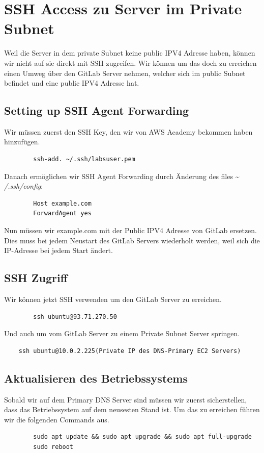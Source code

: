 \documentclass[a4paper,12pt]{article}
\begin{document}
\section{SSH Access zu Server im Private Subnet}
Weil die Server in dem private Subnet keine public IPV4 Adresse haben, können wir nicht auf sie direkt mit SSH zugreifen. 
Wir können um das doch zu erreichen einen Umweg über den GitLab Server nehmen, welcher sich im public Subnet befindet und eine public IPV4 Adresse hat.

\subsection{Setting up SSH Agent Forwarding}
Wir müssen zuerst den SSH Key, den wir von AWS Academy bekommen haben hinzufügen.
\begin{verbatim}
		ssh-add. ~/.ssh/labsuser.pem
\end{verbatim}

Danach ermöglichen wir SSH Agent Forwarding durch Änderung des files \~{} \textit{/.ssh/config}:
\begin{verbatim}
		Host example.com 
		ForwardAgent yes
\end{verbatim}
Nun müssen wir example.com mit der Public IPV4 Adresse von GitLab ersetzen. 
Dies muss bei jedem Neustart des GitLab Servers wiederholt werden, weil sich die IP-Adresse bei jedem Start ändert.


\subsection{SSH Zugriff}
Wir können jetzt SSH verwenden um den GitLab Server zu erreichen.
\begin{verbatim}
		ssh ubuntu@93.71.270.50
\end{verbatim}

Und auch um vom GitLab Server zu einem Private Subnet Server springen.
\begin{verbatim}
	ssh ubuntu@10.0.2.225(Private IP des DNS-Primary EC2 Servers)
\end{verbatim}


\subsection{Aktualisieren des Betriebssystems}

Sobald wir auf dem Primary DNS Server sind müssen wir zuerst sicherstellen, dass das Betriebssystem auf dem neusesten Stand ist.
Um das zu erreichen führen wir die folgenden Commands aus.
\begin{verbatim}
		sudo apt update && sudo apt upgrade && sudo apt full-upgrade
		sudo reboot
\end{verbatim}
\end{document}
